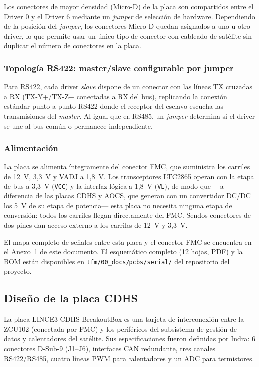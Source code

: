 Los conectores de mayor densidad (Micro-D) de la placa son compartidos entre el Driver 0 y
el Driver 6 mediante un \textit{jumper} de selección de hardware. Dependiendo de la posición del
\textit{jumper}, los conectores Micro-D quedan asignados a uno u otro driver, lo que permite usar
un único tipo de conector con cableado de satélite sin duplicar el número de conectores en
la placa.

\subsubsection{Topología RS422: master/slave configurable por jumper}

Para RS422, cada driver \textit{slave} dispone de un conector con las líneas TX cruzadas a RX
(TX-Y+/TX-Z$-$ conectadas a RX del bus), replicando la conexión estándar punto a punto
RS422 donde el receptor del esclavo escucha las transmisiones del \textit{master}. Al igual que en
RS485, un \textit{jumper} determina si el driver se une al bus común o permanece independiente.

\subsubsection{Alimentación}

La placa se alimenta íntegramente del conector FMC, que suministra los carriles de 12~V, 3,3~V y
VADJ a 1,8~V. Los transceptores LTC2865 operan con la etapa de bus a 3,3~V (\texttt{VCC}) y la
interfaz lógica a 1,8~V (\texttt{VL}), de modo que ---a diferencia de las placas CDHS y AOCS,
que generan con un convertidor DC/DC los 5~V de su etapa de potencia--- esta placa no necesita
ninguna etapa de conversión: todos los carriles llegan directamente del FMC. Sendos conectores
de dos pines dan acceso externo a los carriles de 12~V y 3,3~V.

El mapa completo de señales entre esta placa y el conector FMC se encuentra en el Anexo~1 de
este documento. El esquemático completo (12 hojas, PDF) y la BOM están disponibles en
\texttt{tfm/00\_docs/pcbs/serial/} del repositorio del proyecto.

\subsection{Diseño de la placa CDHS}

La placa LINCE3 CDHS BreakoutBox es una tarjeta de interconexión entre la ZCU102
(conectada por FMC) y los periféricos del subsistema de gestión de datos y calentadores del
satélite. Sus especificaciones fueron definidas por Indra: 6 conectores D-Sub-9 (J1--J6),
interfaces CAN redundante, tres canales RS422/RS485, cuatro líneas PWM para calentadores
y un ADC para termistores.

